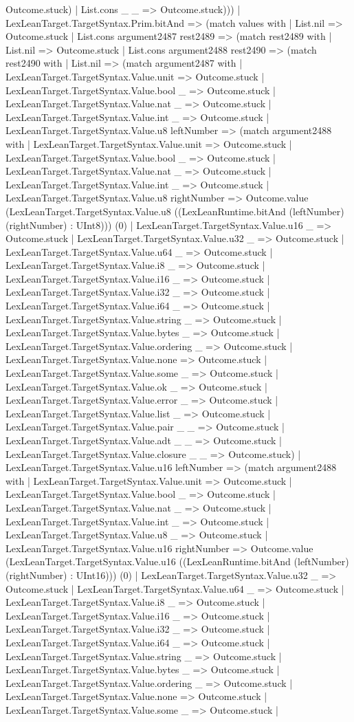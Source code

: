 \documentclass[11pt]{article}
\begin{document}
Outcome.stuck) | List.cons \_ \_ => Outcome.stuck))) | LexLeanTarget.TargetSyntax.Prim.bitAnd => (match values with | List.nil => Outcome.stuck | List.cons argument2487 rest2489 => (match rest2489 with | List.nil => Outcome.stuck | List.cons argument2488 rest2490 => (match rest2490 with | List.nil => (match argument2487 with | LexLeanTarget.TargetSyntax.Value.unit => Outcome.stuck | LexLeanTarget.TargetSyntax.Value.bool \_ => Outcome.stuck | LexLeanTarget.TargetSyntax.Value.nat \_ => Outcome.stuck | LexLeanTarget.TargetSyntax.Value.int \_ => Outcome.stuck | LexLeanTarget.TargetSyntax.Value.u8 leftNumber => (match argument2488 with | LexLeanTarget.TargetSyntax.Value.unit => Outcome.stuck | LexLeanTarget.TargetSyntax.Value.bool \_ => Outcome.stuck | LexLeanTarget.TargetSyntax.Value.nat \_ => Outcome.stuck | LexLeanTarget.TargetSyntax.Value.int \_ => Outcome.stuck | LexLeanTarget.TargetSyntax.Value.u8 rightNumber => Outcome.value (LexLeanTarget.TargetSyntax.Value.u8 ((LexLeanRuntime.bitAnd (leftNumber) (rightNumber) : UInt8))) (0) | LexLeanTarget.TargetSyntax.Value.u16 \_ => Outcome.stuck | LexLeanTarget.TargetSyntax.Value.u32 \_ => Outcome.stuck | LexLeanTarget.TargetSyntax.Value.u64 \_ => Outcome.stuck | LexLeanTarget.TargetSyntax.Value.i8 \_ => Outcome.stuck | LexLeanTarget.TargetSyntax.Value.i16 \_ => Outcome.stuck | LexLeanTarget.TargetSyntax.Value.i32 \_ => Outcome.stuck | LexLeanTarget.TargetSyntax.Value.i64 \_ => Outcome.stuck | LexLeanTarget.TargetSyntax.Value.string \_ => Outcome.stuck | LexLeanTarget.TargetSyntax.Value.bytes \_ => Outcome.stuck | LexLeanTarget.TargetSyntax.Value.ordering \_ => Outcome.stuck | LexLeanTarget.TargetSyntax.Value.none => Outcome.stuck | LexLeanTarget.TargetSyntax.Value.some \_ => Outcome.stuck | LexLeanTarget.TargetSyntax.Value.ok \_ => Outcome.stuck | LexLeanTarget.TargetSyntax.Value.error \_ => Outcome.stuck | LexLeanTarget.TargetSyntax.Value.list \_ => Outcome.stuck | LexLeanTarget.TargetSyntax.Value.pair \_ \_ => Outcome.stuck | LexLeanTarget.TargetSyntax.Value.adt \_ \_ => Outcome.stuck | LexLeanTarget.TargetSyntax.Value.closure \_ \_ => Outcome.stuck) | LexLeanTarget.TargetSyntax.Value.u16 leftNumber => (match argument2488 with | LexLeanTarget.TargetSyntax.Value.unit => Outcome.stuck | LexLeanTarget.TargetSyntax.Value.bool \_ => Outcome.stuck | LexLeanTarget.TargetSyntax.Value.nat \_ => Outcome.stuck | LexLeanTarget.TargetSyntax.Value.int \_ => Outcome.stuck | LexLeanTarget.TargetSyntax.Value.u8 \_ => Outcome.stuck | LexLeanTarget.TargetSyntax.Value.u16 rightNumber => Outcome.value (LexLeanTarget.TargetSyntax.Value.u16 ((LexLeanRuntime.bitAnd (leftNumber) (rightNumber) : UInt16))) (0) | LexLeanTarget.TargetSyntax.Value.u32 \_ => Outcome.stuck | LexLeanTarget.TargetSyntax.Value.u64 \_ => Outcome.stuck | LexLeanTarget.TargetSyntax.Value.i8 \_ => Outcome.stuck | LexLeanTarget.TargetSyntax.Value.i16 \_ => Outcome.stuck | LexLeanTarget.TargetSyntax.Value.i32 \_ => Outcome.stuck | LexLeanTarget.TargetSyntax.Value.i64 \_ => Outcome.stuck | LexLeanTarget.TargetSyntax.Value.string \_ => Outcome.stuck | LexLeanTarget.TargetSyntax.Value.bytes \_ => Outcome.stuck | LexLeanTarget.TargetSyntax.Value.ordering \_ => Outcome.stuck | LexLeanTarget.TargetSyntax.Value.none => Outcome.stuck | LexLeanTarget.TargetSyntax.Value.some \_ => Outcome.stuck | 
\end{document}
